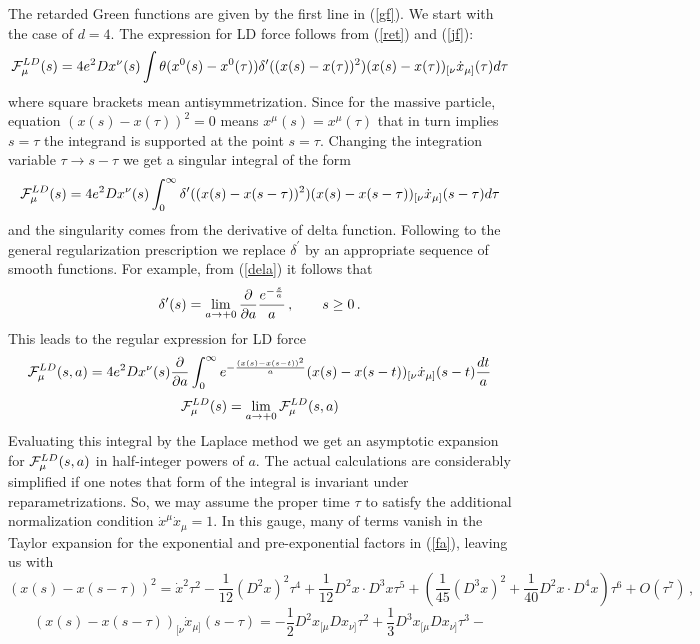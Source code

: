 \documentclass[a4paper,12pt]{article}
\begin{document}
The retarded Green functions are given by the first line in (\ref{gf}). We
start with the case of $d=4$. The expression for LD force
follows from (\ref{ret}) and (\ref{jf}):
\begin{equation}
{\cal F}_\mu ^{LD}(s)=4e^2Dx^\nu (s)\int \theta (x^0(s)-x^0(\tau ))\delta
^{\prime }((x(s)-x(\tau ))^2)(x(s)-x(\tau ))_{[\nu }\dot x_{\mu ]}(\tau
)d\tau
\end{equation}
where square brackets mean antisymmetrization. Since for the massive
particle, equation $(x(s)-x(\tau ))^2=0$ means $x^\mu (s)=x^\mu (\tau )$
that in turn implies $s=\tau $ the integrand is supported at the point $%
s=\tau $. Changing the integration variable $\tau \rightarrow s-\tau $ we
get a singular integral of the form
\begin{equation}
{\cal F}_\mu ^{LD}(s)=4e^2Dx^\nu (s)\int_0^\infty \delta ^{\prime
}((x(s)-x(s-\tau ))^2)(x(s)-x(s-\tau ))_{[\nu }\dot x_{\mu ]}(s-\tau )d\tau
\end{equation}
and the singularity comes from the derivative of delta function. Following
to the general regularization prescription we replace $\delta ^{\prime }$ by
an appropriate sequence of smooth functions. For example, from (\ref{dela})
it follows that
\begin{equation}
\delta ^{\prime }(s)=\lim_{a\rightarrow +0}\frac \partial {\partial a}\frac{%
e^{-\frac sa}}a\,,\qquad s\geq 0\,.  \label{d'a}
\end{equation}
This leads to the regular expression for LD force
\begin{equation}
{\cal F}_\mu ^{LD}(s,a)=4e^2Dx^\nu (s)\frac \partial {\partial
a}\int_0^\infty e^{-\frac{(x(s)-x(s-t))^2}a}(x(s)-x(s-t))_{[\nu }\dot x_{\mu
]}(s-t)\frac{dt}a  \label{fa}
\end{equation}
\begin{equation*}
{\cal F}_\mu ^{LD}(s)=\lim_{a\rightarrow +0}{\cal F}_\mu ^{LD}(s,a)
\end{equation*}
Evaluating this integral by the Laplace method we get an asymptotic
expansion for ${\cal F}_\mu ^{LD}(s,a)$ in half-integer powers of $a$. The
actual calculations are considerably simplified if one notes that form of
the integral is invariant under reparametrizations. So, we may assume the
proper time $\tau $ to satisfy the additional normalization condition $\dot
x^\mu \dot x_\mu =1$. In this gauge, many of terms vanish in the Taylor
expansion for the exponential and pre-exponential factors in (\ref{fa}),
leaving us with
\begin{equation*}
(x(s)-x(s-\tau ))^2=\dot x^2\tau ^2-\frac 1{12}(D^2x)^2\tau ^4+\frac
1{12}D^2x\cdot D^3x\tau ^5+\left( \frac 1{45}(D^3x)^2+\frac 1{40}D^2x\cdot
D^4x\right) \tau ^6+O(\tau ^7)\,,
\end{equation*}
\begin{equation}
(x(s)-x(s-\tau ))_{[\nu }\dot x_{\mu ]}(s-\tau )=-\frac 12D^2x_{[\mu
}Dx_{\nu ]}\tau ^2+\frac 13D^3x_{[\mu }Dx_{\nu ]}\tau ^3-  \label{2}
\end{equation}
\end{document}
